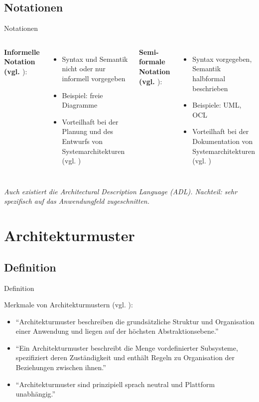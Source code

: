 \documentclass{beamer}
\begin{document}
			\subsection{Notationen}
			\begin{frame}{Notationen}
			\begin{columns}
			\textbf{Informelle Notation (vgl. \cite[ S. 8]{req}}):
				\begin{itemize}
					\item Syntax und Semantik nicht oder nur informell vorgegeben
					\item Beispiel: freie Diagramme
					\item Vorteilhaft bei der Planung und des Entwurfs von Systemarchitekturen (vgl. \cite[ S. 191]{sommer})
				\end{itemize}				
				\textbf{Semi-formale Notation (vgl. \cite[ S. 8]{req}}):
				\begin{itemize}
					\item Syntax vorgegeben, Semantik halbformal beschrieben
					\item Beispiele: UML, OCL
					\item Vorteilhaft bei der Dokumentation von Systemarchitekturen (vgl. \cite[ S. 191]{sommer})
				\end{itemize}
			\end{columns}
			\textit{Auch existiert die Architectural Description Language (ADL). Nachteil: sehr spezifisch auf das Anwendungfeld zugeschnitten.}
			\end{frame}
		
		\section{Architekturmuster}
			\subsection{Definition}
			\begin{frame}{Definition}
				\begin{block}{Merkmale von Architekturmustern (vgl. \cite{wulff}):}
					\begin{itemize}
						\item \enquote{Architekturmuster beschreiben die grundsätzliche 
						Struktur und Organisation einer Anwendung und 
						liegen auf der höchsten Abstraktionsebene.}
					
						\item \enquote{Ein Architekturmuster beschreibt die Menge 
						vordefinierter Subsysteme, spezifiziert deren 
						Zuständigkeit und enthält Regeln zu Organisation 
						der Beziehungen zwischen ihnen.}
					
						\item \enquote{Architekturmuster sind prinzipiell 
						sprach neutral
						und Plattform unabhängig.}
					\end{itemize}
				\end{block}
			\end{frame}
\end{document}
